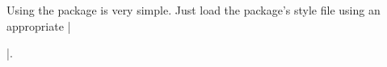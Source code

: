 Using the package is very simple. Just load the package's
style file using an appropriate |\usepackage[extramath]{spel}|.
